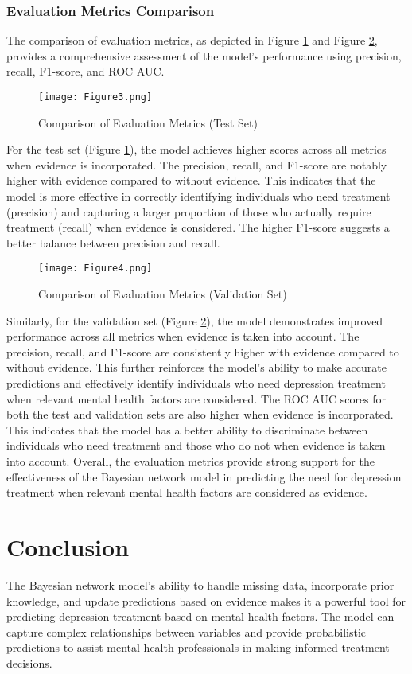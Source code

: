 \documentclass[conference]{IEEEtran}
\begin{document}
\subsubsection{Evaluation Metrics Comparison}
The comparison of evaluation metrics, as depicted in Figure \ref{fig:evaluation_metrics_test} and Figure \ref{fig:evaluation_metrics_validation}, provides a comprehensive assessment of the model's performance using precision, recall, F1-score, and ROC AUC.
\begin{figure}[h]
\centering
\texttt{[image: Figure3.png]}
\caption{Comparison of Evaluation Metrics (Test Set)}
\label{fig:evaluation_metrics_test}
\end{figure}
For the test set (Figure \ref{fig:evaluation_metrics_test}), the model achieves higher scores across all metrics when evidence is incorporated. The precision, recall, and F1-score are notably higher with evidence compared to without evidence. This indicates that the model is more effective in correctly identifying individuals who need treatment (precision) and capturing a larger proportion of those who actually require treatment (recall) when evidence is considered. The higher F1-score suggests a better balance between precision and recall.
\begin{figure}[h]
\centering
\texttt{[image: Figure4.png]}
\caption{Comparison of Evaluation Metrics (Validation Set)}
\label{fig:evaluation_metrics_validation}
\end{figure}
Similarly, for the validation set (Figure \ref{fig:evaluation_metrics_validation}), the model demonstrates improved performance across all metrics when evidence is taken into account. The precision, recall, and F1-score are consistently higher with evidence compared to without evidence. This further reinforces the model's ability to make accurate predictions and effectively identify individuals who need depression treatment when relevant mental health factors are considered.
The ROC AUC scores for both the test and validation sets are also higher when evidence is incorporated. This indicates that the model has a better ability to discriminate between individuals who need treatment and those who do not when evidence is taken into account.
Overall, the evaluation metrics provide strong support for the effectiveness of the Bayesian network model in predicting the need for depression treatment when relevant mental health factors are considered as evidence.

\section{Conclusion}
The Bayesian network model's ability to handle missing data, incorporate prior knowledge, and update predictions based on evidence makes it a powerful tool for predicting depression treatment based on mental health factors. The model can capture complex relationships between variables and provide probabilistic predictions to assist mental health professionals in making informed treatment decisions.
\end{document}
